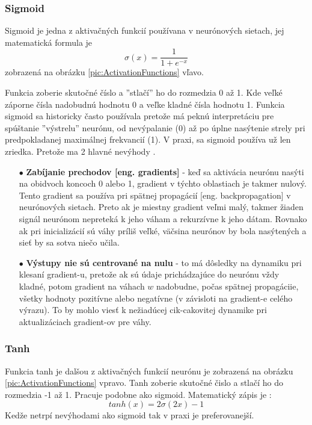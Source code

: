\subsubsection{Sigmoid}
Sigmoid je jedna z aktivačných funkcií používana v neurónových sietach, jej matematická formula je
\begin{equation}
    \sigma(x) = \frac{1}{1 + e^{-x}}
\end{equation}
zobrazená na obrázku \ref{pic:ActivationFunctions} vľavo.

Funkcia zoberie skutočné číslo a ''stlačí'' ho do rozmedzia 0 až 1.
Kde veľké záporne čísla nadobudnú hodnotu 0 a veľke kladné čísla hodnotu 1.
Funkcia sigmoid sa historicky často používala pretože má peknú interpretáciu pre spúštanie ''výstrelu'' neurónu,
    od nevýpalanie (0) až po úplne nasýtenie strely pri predpokladanej maximálnej frekvancií (1).
V praxi, sa sigmoid používa už len zriedka.
Pretože ma 2 hlavné nevýhody \cite{odkaz:ConvolutionalNeuralNetworkCS231n}.
\begin{enumerate}
    \item[$\bullet$] \textbf{Zabíjanie prechodov [eng. gradients]} - keď sa aktivácia neurónu nasýti na obidvoch koncoch 0 alebo 1, gradient v týchto oblastiach je takmer nulový.
    Tento gradient sa používa pri spätnej propagácií [eng. backpropagation] v neurónových sietach. Preto ak je miestny gradient veľmi malý, takmer žiaden signál
    neurónom nepreteká k jeho váham a rekurzívne k jeho dátam. Rovnako ak pri inicializácií sú váhy príliš veľké, väčsina neurónov by bola nasýtených a sieť by sa sotva niečo učila.
    \item[$\bullet$] \textbf{Výstupy nie sú centrované na nulu} - to má dôsledky na dynamiku pri klesaní gradient-u, pretože ak sú údaje prichádzajúce do neurónu vždy kladné,
    potom gradient na váhach $w$ nadobudne, počas spätnej propagáciie, všetky hodnoty pozitívne alebo negatívne (v závisloti na gradient-e celého výrazu).
    To by mohlo viesť k nežiadúcej cik-cakovitej dynamike pri aktualizáciach gradient-ov pre váhy.
\end{enumerate}


\subsubsection{Tanh}
Funkcia tanh je dalšou z aktivačných funkcií neurónu je zobrazená na obrázku \ref{pic:ActivationFunctions} vpravo.
Tanh zoberie skutočné čislo a stlačí ho do rozmedzia -1 až 1. Pracuje podobne ako sigmoid.
Matematický zápis je \cite{odkaz:ConvolutionalNeuralNetworkCS231n}:
\begin{equation}
    tanh(x) = 2\sigma(2x) - 1
\end{equation}
Kedže netrpí nevýhodami ako sigmoid tak v praxi je preferovanejší.


